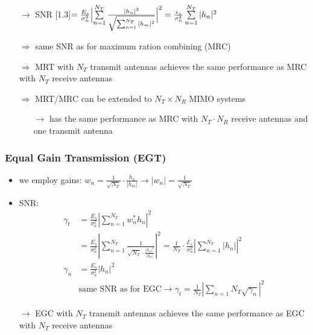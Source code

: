 \documentclass[a4paper, 10pt]{article}
\begin{document}
\begin{itemize}
\begin{itemize}
		\end{itemize}
		\item[$\rightarrow$] SNR \scalebox{1.3}[1.3]{$ = \frac{E_s}{\sigma _n^2}\Bigl | \sum\limits_{n = 1}^{N_T}\frac{|h_n|^2}{\sqrt{\sum_{n = 1}^{N_T}|h_m|^2}}\Bigr |^2 = \frac{\epsilon _s}{\sigma _n^2}\sum\limits_{n = 1}^{N_T}|h_n|^2 $}
		\item[$\Rightarrow$] same SNR as for maximum ration combining (MRC)
		\item[$\Rightarrow$] MRT with $N_T$ transmit antennas achieves the same performance as MRC with $N_T$ receive antennas
		\item[$\Rightarrow$] MRT/MRC can be extended to $ N_T\times N_R $ MIMO systems
		\begin{itemize}
			\item[$\rightarrow$] has the same performance as MRC with $N_T\cdot N_R$ receive antennas and one transmit antenna
		\end{itemize}
	\end{itemize}
\subsubsection*{Equal Gain Transmission (EGT)}
\begin{itemize}
	\item we employ gains: $w_n = \frac{1}{\sqrt{N_T}}\cdot \frac{h_n}{|h_m|} \rightarrow |w_n| = \frac{1}{\sqrt{N_T}} $
	\item SNR:
	\begin{align*}
		\gamma _t &= \frac{E_s}{\sigma _n^2}\left|\sum_{n = 1}^{N_T} w_n^*h_n \right |^2\\
		&= \frac{E_s}{\sigma _n^2}\left|\sum_{n = 1}^{N_T}\frac{1}{\sqrt{N_T}\cdot \frac{|h_n|^2}{|h_n|}} \right|^2 = \frac{1}{N_T}\cdot \frac{\mathcal{E}_s}{\sigma _n^2} \left|\sum_{n = 1}^{N_T}|h_n| \right|^2\\
		\gamma _n &= \frac{E_s}{\sigma _n^2}|h_n|^2\\
		&\text{same SNR as for EGC} \rightarrow \gamma _t = \frac{1}{N_T} \left| \sum_{n = 1}{N_T}\sqrt{\gamma _n} \right|^2
	\end{align*}
	\item[$\rightarrow$] EGC with $ N_T$ transmit antennas achieves the same performance as EGC with $ N_T$ receive antennas
\end{itemize}
\end{document}
